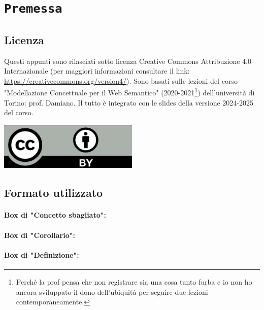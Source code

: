 \chapter*{\centering \texttt{Premessa}}

\section*{Licenza}

Questi appunti sono rilasciati sotto licenza Creative Commons Attribuzione 4.0 Internazionale (per maggiori
informazioni consultare il link: \href{https://creativecommons.org/version4/}{https://creativecommons.org/version4/}). Sono basati sulle lezioni del corso "Modellazione Concettuale per il Web Semantico" (2020-2021\footnote{Perché la prof pensa che non registrare sia una cosa tanto furba e io non ho ancora sviluppato il dono dell'ubiquità per seguire due lezioni contemporaneamente.}) dell'università di Torino: prof. Damiano. Il tutto è integrato con le slides della versione 2024-2025 del corso.
\begin{center}
    \includegraphics[width=0.5\textwidth]{images/cc.png}
\end{center}

\section*{Formato utilizzato}

\subsubsection{Box di "Concetto sbagliato":}


\subsubsection{Box di "Corollario":}


\subsubsection{Box di "Definizione":}

